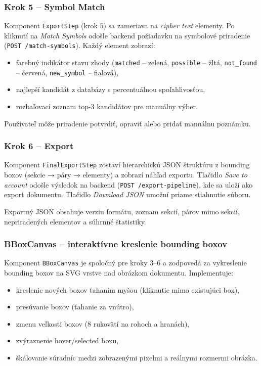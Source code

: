 
\subsubsection{Krok 5 – Symbol Match}

Komponent \texttt{ExportStep} (krok 5) sa zameriava na \textit{cipher text} elementy. Po kliknutí na \textit{Match Symbols} odošle backend požiadavku na symbolové priradenie (\texttt{POST /match-symbols}). Každý element zobrazí:
\begin{itemize}
    \item farebný indikátor stavu zhody (\texttt{matched} – zelená, \texttt{possible} – žltá, \texttt{not\_found} – červená, \texttt{new\_symbol} – fialová),
    \item najlepší kandidát z databázy s percentuálnou spoľahlivosťou,
    \item rozbaľovací zoznam top-3 kandidátov pre manuálny výber.
\end{itemize}
Používateľ môže priradenie potvrdiť, opraviť alebo pridať manuálnu poznámku.


\subsubsection{Krok 6 – Export}

Komponent \texttt{FinalExportStep} zostaví hierarchickú JSON štruktúru z bounding boxov (sekcie → páry → elementy) a zobrazí náhľad exportu. Tlačidlo \textit{Save to account} odošle výsledok na backend (\texttt{POST /export-pipeline}), kde sa uloží ako export dokumentu. Tlačidlo \textit{Download JSON} umožní priame stiahnutie súboru.

Exportný JSON obsahuje verziu formátu, zoznam sekcií, párov mimo sekcií, nepriradených elementov a súhrnné štatistiky.


\subsubsection{BBoxCanvas – interaktívne kreslenie bounding boxov}

Komponent \texttt{BBoxCanvas} je spoločný pre kroky 3–6 a zodpovedá za vykreslenie bounding boxov na SVG vrstve nad obrázkom dokumentu. Implementuje:
\begin{itemize}
    \item kreslenie nových boxov ťahaním myšou (kliknutie mimo existujúci box),
    \item presúvanie boxov (ťahanie za vnútro),
    \item zmenu veľkosti boxov (8 rukovätí na rohoch a hranách),
    \item zvýraznenie hover/selected boxu,
    \item škálovanie súradníc medzi zobrazenými pixelmi a reálnymi rozmermi obrázka.
\end{itemize}

